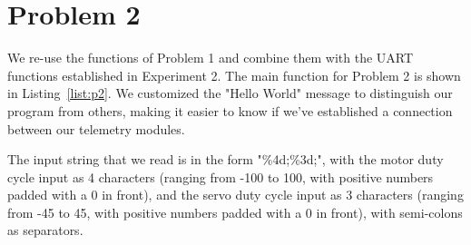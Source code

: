 \section*{Problem 2}
We re-use the functions of Problem 1 and combine them with the UART functions established in Experiment 2. The main function for Problem 2 is shown in Listing~\ref{list:p2}. We customized the "Hello World" message to distinguish our program from others, making it easier to know if we've established a connection between our telemetry modules.

The input string that we read is in the form "\%4d;\%3d;", with the motor duty cycle input as 4 characters (ranging from -100 to 100, with positive numbers padded with a 0 in front), and the servo duty cycle input as 3 characters (ranging from -45 to 45, with positive numbers padded with a 0 in front), with semi-colons as separators.
